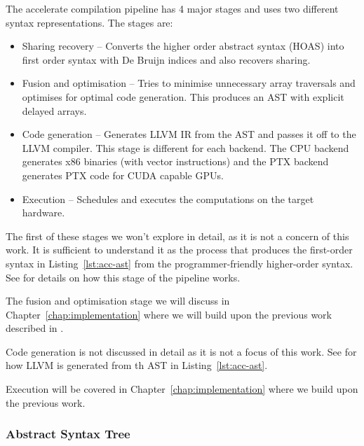 The accelerate compilation pipeline has 4 major stages and uses two different syntax representations. The stages are:
%
\begin{itemize}
%
\item Sharing recovery -- Converts the higher order abstract syntax (HOAS) into first order syntax with De Bruijn indices and also recovers sharing.
%
%
\item Fusion and optimisation -- Tries to minimise unnecessary array traversals and optimises for optimal code generation. This produces an AST with explicit delayed arrays.
%
\item Code generation -- Generates LLVM IR from the AST and passes it off to the LLVM compiler. This stage is different for each backend. The CPU backend generates x86 binaries (with vector instructions) and the PTX backend generates PTX code for CUDA capable GPUs.
%
\item Execution -- Schedules and executes the computations on the target hardware.
\end{itemize}
%

The first of these stages we won't explore in detail, as it is not a concern of this work. It is sufficient to understand it as the process that produces the first-order syntax in Listing~\ref{lst:acc-ast} from the programmer-friendly higher-order syntax. See \citet{McDonell:acc-optim} for details on how this stage of the pipeline works.

The fusion and optimisation stage we will discuss in Chapter~\ref{chap:implementation} where we will build upon the previous work described in \citet{McDonell:acc-optim}.

Code generation is not discussed in detail as it is not a focus of this work. See \citet{McDonell:2015:acc-llvm} for how LLVM is generated from th AST in Listing~\ref{lst:acc-ast}.

Execution will be covered in Chapter~\ref{chap:implementation} where we build upon the previous work\cite{McDonell:acc-optim,McDonell:2015:acc-llvm,Chakravarty:acc-cuda}.

\subsubsection{Abstract Syntax Tree}

